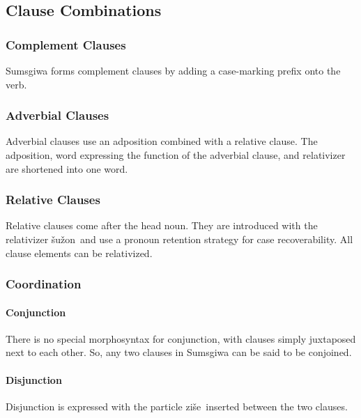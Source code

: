 \subsection{Clause Combinations}

\subsubsection{Complement Clauses}
Sumsgiwa forms complement clauses by adding a case-marking prefix onto the verb.

\subsubsection{Adverbial Clauses}
Adverbial clauses use an adposition combined with a relative clause. The adposition, word expressing the function of the adverbial clause, and relativizer are shortened into one word.


\subsubsection{Relative Clauses} \label{04_06_03_Relative Clauses}
Relative clauses come after the head noun. They are introduced with the relativizer \textlangle šužon\textrangle~and use a pronoun retention strategy for case recoverability. All clause elements can be relativized.

\subsubsection{Coordination}

\paragraph{Conjunction}
There is no special morphosyntax for conjunction, with clauses simply juxtaposed next to each other. So, any two clauses in Sumsgiwa can be said to be conjoined.

\paragraph{Disjunction}
Disjunction is expressed with the particle \textlangle ziše\textrangle~inserted between the two clauses.
